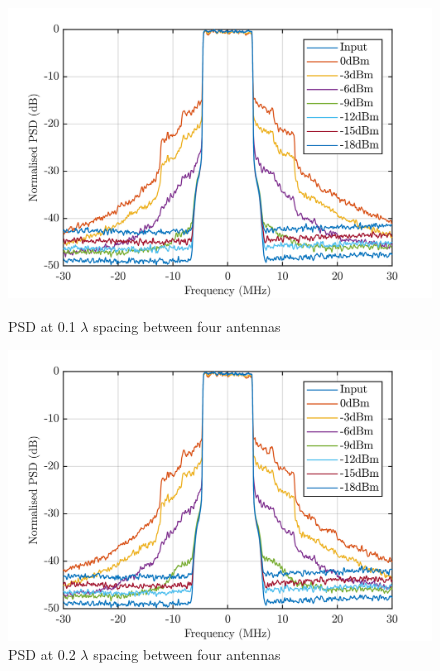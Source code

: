 \begin{figure}[H]
  \centering
  \begin{minipage}[b]{0.5\textwidth}
	\includegraphics[scale = 0.5]{figures/measurement/four_antenna/psd_0p1.png}
	\caption{PSD at 0.1 $\lambda$ spacing between four antennas}
    \label{fig:psd01_4}
  \end{minipage}
  \hfill
  \begin{minipage}[b]{0.4\textwidth}
\includegraphics[scale = 0.5]{figures/measurement/four_antenna/psd_0p2.png}
\caption{PSD at 0.2 $\lambda$ spacing between four antennas}
    \label{fig:psd02_4}
  \end{minipage}
\end{figure}


